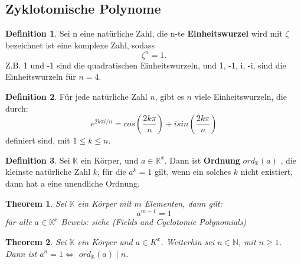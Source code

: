 \documentclass[12pt,oneside]{article}
\newtheorem{theorem}{Theorem}[section]
\theoremstyle{remark}
\theoremstyle{definition}
\newtheorem{definition}{Definition}[section]
\begin{document}
\subsection{Zyklotomische Polynome}

\begin{definition}
Sei n eine natürliche Zahl, die n-te \textbf{Einheitswurzel} wird mit $\zeta$ bezeichnet ist eine komplexe Zahl, sodass
\begin{equation}
    \zeta^n = 1.
\end{equation}
Z.B. 1 und -1 sind die quadratischen Einheitswurzeln, und 1, -1, i, -i, sind die Einheitswurzeln für $n = 4$.    
\end{definition}

\smallskip

\begin{definition}
Für jede natürliche Zahl $n$, gibt es $n$ viele Einheitswurzeln, die durch:\newline
\begin{equation}
    e^{2k\pi i/n} = cos(\frac{2k \pi }{n}) + i sin(\frac{2k \pi}{n})
\end{equation}
definiert sind, mit $1 \leq k \leq n$.
\end{definition}

\smallskip

\begin{definition}\label{ord_def}
Sei $\mathbb{K}$ ein Körper, und $a \in \mathbb{K}^x$. Dann ist \textbf{Ordnung} $ ord_{ \mathbb{K} }(a)$ , die kleinste natürliche Zahl $k$, für die $a^k = 1 $ gilt, wenn ein solches $k$ nicht existiert, dann hat a eine unendliche Ordnung. 
\end{definition}

\smallskip

\begin{theorem}
Sei $\mathbb{K}$ ein Körper mit $m$ Elementen, dann gilt:
\begin{equation}
    a^{m-1} = 1
\end{equation}
für alle $a \in \mathbb{K}^x$\newline
Beweis: siehe (Fields and Cyclotomic Polynomials) 
\end{theorem}

\smallskip

\begin{theorem}
Sei $\mathbb{K}$ ein Körper und $a \in K^x$. Weiterhin sei $ n \in \mathbb{N}$, mit $n \geq 1$. Dann ist $a^n = 1 \Leftrightarrow	 $ $ord_{\mathbb{K}}(a) \mid n$. 
\end{theorem}
\end{document}
